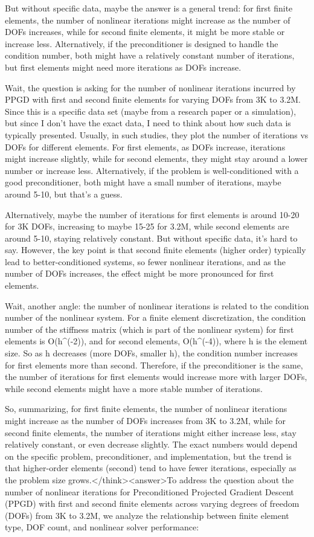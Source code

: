 But without specific data, maybe the answer is a general trend: for first finite elements, the number of nonlinear iterations might increase as the number of DOFs increases, while for second finite elements, it might be more stable or increase less. Alternatively, if the preconditioner is designed to handle the condition number, both might have a relatively constant number of iterations, but first elements might need more iterations as DOFs increase.

Wait, the question is asking for the number of nonlinear iterations incurred by PPGD with first and second finite elements for varying DOFs from 3K to 3.2M. Since this is a specific data set (maybe from a research paper or a simulation), but since I don't have the exact data, I need to think about how such data is typically presented. Usually, in such studies, they plot the number of iterations vs DOFs for different elements. For first elements, as DOFs increase, iterations might increase slightly, while for second elements, they might stay around a lower number or increase less. Alternatively, if the problem is well-conditioned with a good preconditioner, both might have a small number of iterations, maybe around 5-10, but that's a guess.

Alternatively, maybe the number of iterations for first elements is around 10-20 for 3K DOFs, increasing to maybe 15-25 for 3.2M, while second elements are around 5-10, staying relatively constant. But without specific data, it's hard to say. However, the key point is that second finite elements (higher order) typically lead to better-conditioned systems, so fewer nonlinear iterations, and as the number of DOFs increases, the effect might be more pronounced for first elements.

Wait, another angle: the number of nonlinear iterations is related to the condition number of the nonlinear system. For a finite element discretization, the condition number of the stiffness matrix (which is part of the nonlinear system) for first elements is O(h^(-2)), and for second elements, O(h^(-4)), where h is the element size. So as h decreases (more DOFs, smaller h), the condition number increases for first elements more than second. Therefore, if the preconditioner is the same, the number of iterations for first elements would increase more with larger DOFs, while second elements might have a more stable number of iterations.

So, summarizing, for first finite elements, the number of nonlinear iterations might increase as the number of DOFs increases from 3K to 3.2M, while for second finite elements, the number of iterations might either increase less, stay relatively constant, or even decrease slightly. The exact numbers would depend on the specific problem, preconditioner, and implementation, but the trend is that higher-order elements (second) tend to have fewer iterations, especially as the problem size grows.</think><answer>To address the question about the number of nonlinear iterations for Preconditioned Projected Gradient Descent (PPGD) with first and second finite elements across varying degrees of freedom (DOFs) from 3K to 3.2M, we analyze the relationship between finite element type, DOF count, and nonlinear solver performance:  

